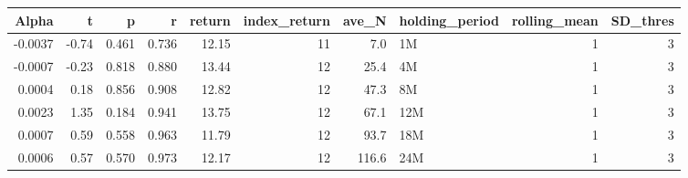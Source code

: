 \begin{table}[ht]
\centering
\begin{tabular}{rrrrrrrlrr}
  \hline
Alpha & t & p & r & return & index\_return & ave\_N & holding\_period & rolling\_mean & SD\_thres \\ 
  \hline
-0.0037 & -0.74 & 0.461 & 0.736 & 12.15 & 11 & 7.0 & 1M &  1 &  3 \\ 
  -0.0007 & -0.23 & 0.818 & 0.880 & 13.44 & 12 & 25.4 & 4M &  1 &  3 \\ 
  0.0004 & 0.18 & 0.856 & 0.908 & 12.82 & 12 & 47.3 & 8M &  1 &  3 \\ 
  0.0023 & 1.35 & 0.184 & 0.941 & 13.75 & 12 & 67.1 & 12M &  1 &  3 \\ 
  0.0007 & 0.59 & 0.558 & 0.963 & 11.79 & 12 & 93.7 & 18M &  1 &  3 \\ 
  0.0006 & 0.57 & 0.570 & 0.973 & 12.17 & 12 & 116.6 & 24M &  1 &  3 \\ 
   \hline
\end{tabular}
\end{table}

